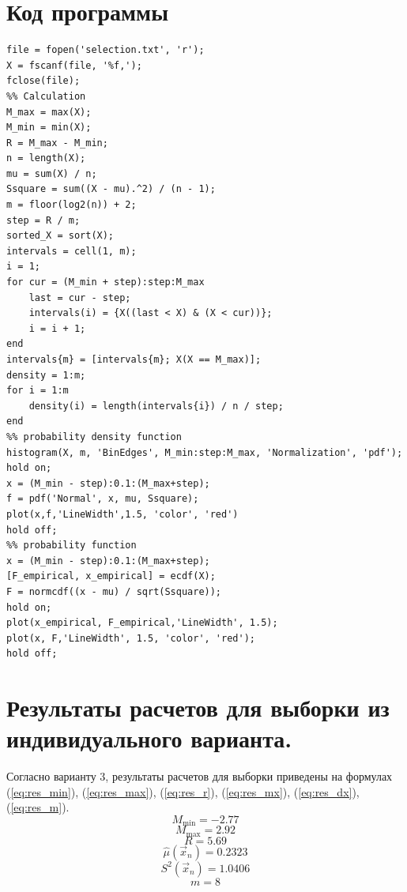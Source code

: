 \section{Код программы}
\begin{lstlisting}[label=lst:code, caption=Программа для MatLAB, basicstyle=\footnotesize]
file = fopen('selection.txt', 'r');
X = fscanf(file, '%f,');
fclose(file);
%% Calculation
M_max = max(X);
M_min = min(X);
R = M_max - M_min;
n = length(X);
mu = sum(X) / n;
Ssquare = sum((X - mu).^2) / (n - 1);
m = floor(log2(n)) + 2;
step = R / m;
sorted_X = sort(X);
intervals = cell(1, m);
i = 1;
for cur = (M_min + step):step:M_max
    last = cur - step;
    intervals(i) = {X((last < X) & (X < cur))};
    i = i + 1;
end
intervals{m} = [intervals{m}; X(X == M_max)];
density = 1:m;
for i = 1:m
    density(i) = length(intervals{i}) / n / step;
end
%% probability density function
histogram(X, m, 'BinEdges', M_min:step:M_max, 'Normalization', 'pdf');
hold on;
x = (M_min - step):0.1:(M_max+step);
f = pdf('Normal', x, mu, Ssquare);
plot(x,f,'LineWidth',1.5, 'color', 'red')
hold off;
%% probability function
x = (M_min - step):0.1:(M_max+step);
[F_empirical, x_empirical] = ecdf(X);
F = normcdf((x - mu) / sqrt(Ssquare));
hold on;
plot(x_empirical, F_empirical,'LineWidth', 1.5);
plot(x, F,'LineWidth', 1.5, 'color', 'red');
hold off;
\end{lstlisting}

\newpage
\section{Результаты расчетов для выборки из индивидуального варианта.}
Согласно варианту 3, результаты расчетов для выборки приведены на формулах (\ref{eq:res_min}), (\ref{eq:res_max}), (\ref{eq:res_r}), (\ref{eq:res_mx}), (\ref{eq:res_dx}), (\ref{eq:res_m}).
\begin{equation}
	\label{eq:res_min}
	M_{\min} = -2.77
\end{equation}
\begin{equation}
	\label{eq:res_max}
	M_{\max} = 2.92
\end{equation}
\begin{equation}
	\label{eq:res_r}
	R = 5.69
\end{equation}
\begin{equation}
	\label{eq:res_mx}
	\hat\mu(\vec x_n) = 0.2323
\end{equation}
\begin{equation}
	\label{eq:res_dx}
	S^2(\vec x_n) = 1.0406
\end{equation}
\begin{equation}
	\label{eq:res_m}
	m = 8
\end{equation}

